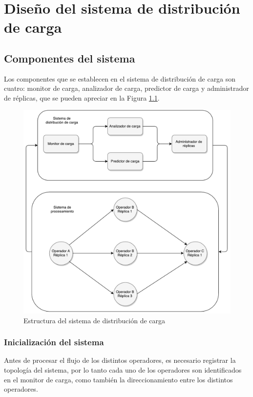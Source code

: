 \chapter{Diseño del sistema de distribución de carga}
\label{cap:estructuraSistema}
\section{Componentes del sistema}
	Los componentes que se establecen en el sistema de distribución de carga son cuatro: monitor de carga, analizador de carga, predictor de carga y administrador de réplicas, que se pueden apreciar en la Figura \ref{fig:componentesSistemas}. 

\begin{figure}[hb!]
  \centering
    \includegraphics[scale=0.5]{images/Diagrama.pdf}
  \caption{Estructura del sistema de distribución de carga}
  \label{fig:componentesSistemas}
\end{figure}

\subsection{Inicialización del sistema}
	Antes de procesar el flujo de los distintos operadores, es necesario registrar la topología del sistema, por lo tanto cada uno de los operadores son identificados en el monitor de carga, como también la direccionamiento entre los distintos operadores.
	
